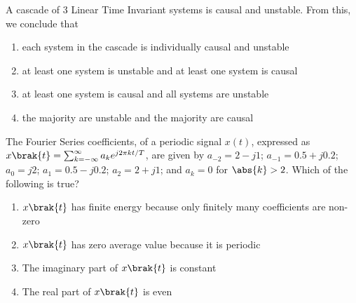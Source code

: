     \item A cascade of 3 Linear Time Invariant systems is causal and unstable. From this, we conclude that
    \begin{enumerate}
        \item each system in the cascade is individually causal and unstable
        \item at least one system is unstable and at least one system is causal
        \item at least one system is causal and all systems are unstable
        \item the majority are unstable and the majority are causal
    \end{enumerate}
    \item The Fourier Series coefficients, of a periodic signal $x(t)$, expressed as $x\brak{t} = \sum_{k=-\infty}^{\infty} a_k e^{j2\pi k t/T}$, are given by $a_{-2} = 2 - j1$; $a_{-1} = 0.5 + j0.2$; $a_0 = j2$; $a_1 = 0.5 - j0.2$; $a_2 = 2 + j1$; and $a_k = 0$ for $\abs{k} > 2$. Which of the following is true?
    \begin{enumerate}
        \item $x\brak{t}$ has finite energy because only finitely many coefficients are non-zero
        \item $x\brak{t}$ has zero average value because it is periodic
        \item The imaginary part of $x\brak{t}$ is constant
        \item The real part of $x\brak{t}$ is even
    \end{enumerate}
